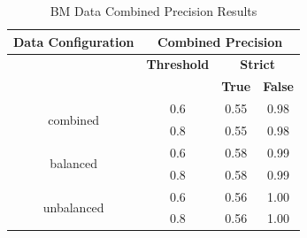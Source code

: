 \documentclass{mpaper}
\begin{document}
\begin{table}[]
\centering
\begin{tabular}{|c|ccc|}
\hline
\textbf{Data Configuration} & \multicolumn{3}{c|}{\textbf{Combined Precision}}                                              \\ \hline
                              & \multicolumn{1}{c|}{\textbf{Threshold}} & \multicolumn{2}{c|}{\textbf{Strict}}                \\ \cline{2-4} 
                              & \multicolumn{1}{c|}{\textbf{}}          & \textbf{True} & \multicolumn{1}{l|}{\textbf{False}} \\ \hline
\multirow{2}{*}{combined}     & \multicolumn{1}{c|}{0.6}                & 0.55          & 0.98                                \\
                              & \multicolumn{1}{c|}{0.8}                & 0.55          & 0.98                                \\ \hline
\multirow{2}{*}{balanced}     & \multicolumn{1}{c|}{0.6}                & 0.58          & 0.99                                \\
                              & \multicolumn{1}{c|}{0.8}                & 0.58          & 0.99                                \\ \hline
\multirow{2}{*}{unbalanced}   & \multicolumn{1}{c|}{0.6}                & 0.56          & 1.00                                \\
                              & \multicolumn{1}{c|}{0.8}                & 0.56          & 1.00                                \\ \hline
\end{tabular}
\caption{\label{tab:bm_combined_precision}BM Data Combined Precision Results}
\end{table}
\end{document}
